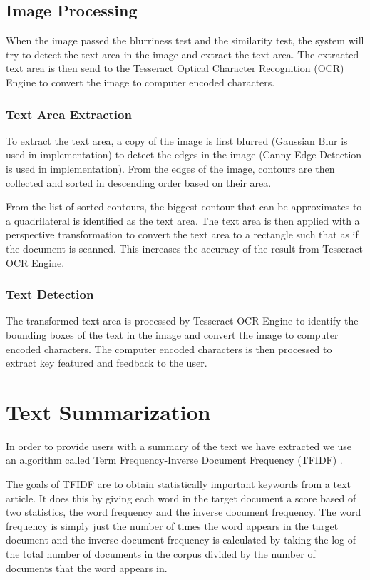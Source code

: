 \subsection{Image Processing}
When the image passed the blurriness test and the similarity test, the system will try to detect the text area in the image and extract the text area. The extracted text area is then send to the Tesseract Optical Character Recognition (OCR) Engine to convert the image to computer encoded characters.

\subsubsection{Text Area Extraction}
To extract the text area, a copy of the image is first blurred (Gaussian Blur is used in implementation) to detect the edges in the image (Canny Edge Detection is used in implementation). From the edges of the image, contours are then collected and sorted in descending order based on their area.


From the list of sorted contours, the biggest contour that can be approximates to a quadrilateral is identified as the text area. The text area is then applied with a perspective transformation to convert the text area to a rectangle such that as if the document is scanned. This increases the accuracy of the result from Tesseract OCR Engine. 

\subsubsection{Text Detection}
The transformed text area is processed by Tesseract OCR Engine to identify the bounding boxes of the text in the image and convert the image to computer encoded characters. The computer encoded characters is then processed to extract key featured and feedback to the user.

\section{Text Summarization}
In order to provide users with a summary of the text we have extracted we use an algorithm called Term Frequency-Inverse Document Frequency (TFIDF) .

The goals of TFIDF are to obtain statistically important keywords from a text article. 
It does this by giving each word in the target document a score based of two statistics, the word frequency and the inverse document frequency.
The word frequency is simply just the number of times the word appears in the target document and the inverse document frequency is calculated by taking the log of the total number of documents in the corpus divided by the number of documents that the word appears in.

